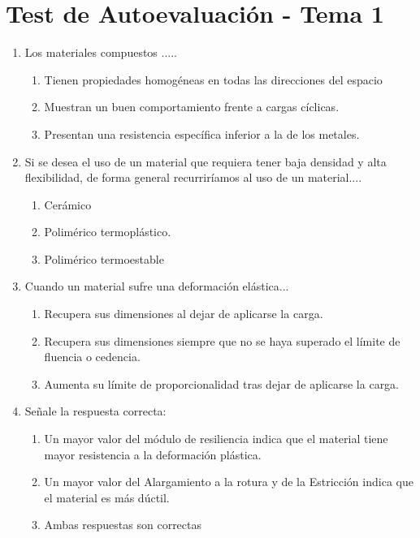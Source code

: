 \clearpage
\section{Test de Autoevaluación - Tema 1}

\begin{enumerate}[label=\textbf{\arabic*.}]
    \item Los materiales compuestos .....
          \begin{enumerate}[label=\alph*.]
              \item Tienen propiedades homogéneas en todas las direcciones del espacio
              \item \textcolor{red!85!black}{Muestran un buen comportamiento frente a cargas cíclicas.}
              \item Presentan una resistencia específica inferior a la de los metales.
          \end{enumerate}

    \item Si se desea el uso de un material que requiera tener baja densidad y alta flexibilidad, de forma general recurriríamos al uso de un material....
          \begin{enumerate}[label=\alph*.]
              \item Cerámico
              \item \textcolor{red!85!black}{Polimérico termoplástico.}
              \item Polimérico termoestable
          \end{enumerate}

    \item Cuando un material sufre una deformación elástica...
          \begin{enumerate}[label=\alph*.]
              \item \textcolor{red!85!black}{Recupera sus dimensiones al dejar de aplicarse la carga.}
              \item Recupera sus dimensiones siempre que no se haya superado el límite de fluencia o cedencia.
              \item Aumenta su límite de proporcionalidad tras dejar de aplicarse la carga.
          \end{enumerate}

    \item Señale la respuesta correcta:
          \begin{enumerate}[label=\alph*.]
              \item Un mayor valor del módulo de resiliencia indica que el material tiene mayor resistencia a la deformación plástica.
              \item \textcolor{red!85!black}{Un mayor valor del Alargamiento a la rotura y de la Estricción indica que el material es más dúctil.}
              \item Ambas respuestas son correctas
          \end{enumerate}


\end{enumerate}
